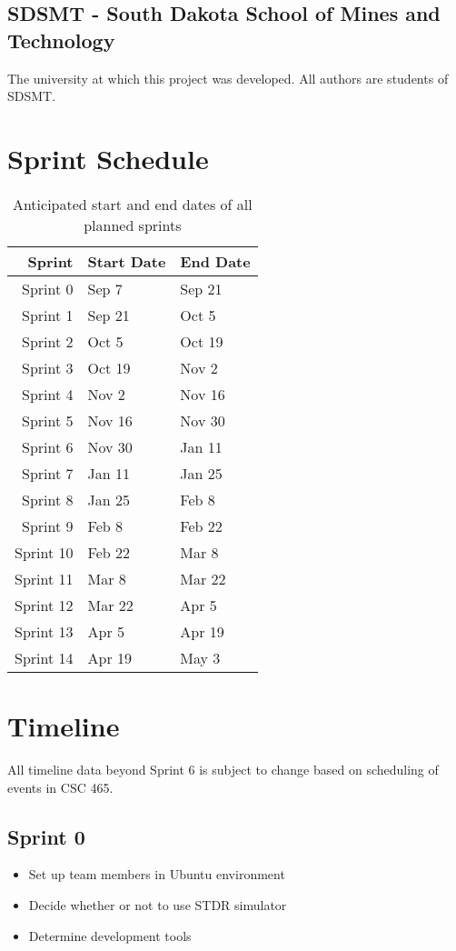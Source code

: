 \subsection{SDSMT - South Dakota School of Mines and Technology}
The university at which this project was developed. All authors are students of SDSMT.

\section{Sprint Schedule}
\begin{table}
\begin{center}
	\begin{tabular}{r | l l}
		Sprint & Start Date & End Date \\ \hline
		Sprint 0 & Sep 7 & Sep 21 \\
		Sprint 1 & Sep 21 & Oct 5 \\
		Sprint 2 & Oct 5 & Oct 19 \\
		Sprint 3 & Oct 19 & Nov 2 \\
		Sprint 4 & Nov 2 & Nov 16 \\
		Sprint 5 & Nov 16 & Nov 30 \\
		Sprint 6 & Nov 30 & Jan 11 \\
		Sprint 7 & Jan 11 & Jan 25 \\
		Sprint 8 & Jan 25 & Feb 8 \\
		Sprint 9 & Feb 8 & Feb 22 \\
		Sprint 10 & Feb 22 & Mar 8 \\
		Sprint 11 & Mar 8 & Mar 22 \\
		Sprint 12 & Mar 22 & Apr 5 \\
		Sprint 13 & Apr 5 & Apr 19 \\
		Sprint 14 & Apr 19 & May 3 \\
	\end{tabular}
\end{center}
\caption{Anticipated start and end dates of all planned sprints}
\end{table}

\section{Timeline}
All timeline data beyond Sprint 6 is subject to change based on scheduling of events in CSC 465.
\subsection{Sprint 0}
\begin{itemize}
	\item Set up team members in Ubuntu environment
	\item Decide whether or not to use STDR simulator 
 	\item Determine development tools
\end{itemize}

